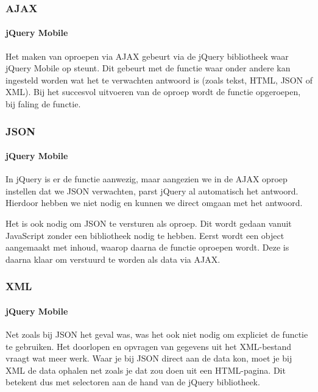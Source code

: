 \subsubsection{AJAX}

\paragraph{jQuery Mobile} 
Het maken van oproepen via AJAX gebeurt via de jQuery bibliotheek waar jQuery Mobile op steunt. Dit gebeurt met de functie  waar onder andere kan ingesteld worden wat het te verwachten antwoord is (zoals tekst, HTML, JSON of XML). Bij het succesvol uitvoeren van de oproep wordt de  functie opgeroepen, bij faling de  functie.

\subsubsection{JSON}

\paragraph{jQuery Mobile} 
In jQuery is er de functie  aanwezig, maar aangezien we in de AJAX oproep instellen dat we JSON verwachten, parst jQuery al automatisch het antwoord. Hierdoor hebben we  niet nodig en kunnen we direct omgaan met het antwoord.

Het is ook nodig om JSON te versturen als oproep. Dit wordt gedaan vanuit JavaScript zonder een bibliotheek nodig te hebben. Eerst wordt een object aangemaakt met inhoud, waarop daarna de functie  oproepen wordt. Deze is daarna klaar om verstuurd te worden als data via AJAX.

\subsubsection{XML}

\paragraph{jQuery Mobile} 
Net zoals bij JSON het geval was, was het ook niet nodig om expliciet de  functie te gebruiken. Het doorlopen en opvragen van gegevens uit het XML-bestand vraagt wat meer werk. Waar je bij JSON direct aan de data kon, moet je bij XML de data ophalen net zoals je dat zou doen uit een HTML-pagina. Dit betekent dus met selectoren aan de hand van de jQuery bibliotheek.

